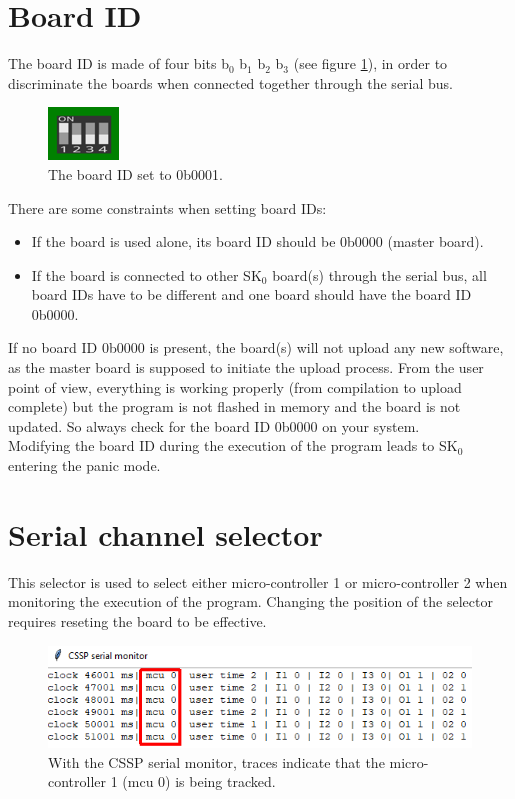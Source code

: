 \section{Board ID}
The board ID is made of four bits b$_0$ b$_1$ b$_2$ b$_3$ (see figure \ref{annexes:SK0-boardid}), in order to discriminate the boards when connected together through the serial bus.
\begin{figure}[h]
\centering\includegraphics[scale=0.668]{Pictures/chapterAnnexes/boardid.png}
\caption{The board ID set to 0b0001.}
\label{annexes:SK0-boardid}
\end{figure}
There are some constraints when setting board IDs:
\begin{itemize}
    \item If the board is used alone, its board ID should be 0b0000 (master board).
    \item If the board is connected to other SK$_0$ board(s) through the serial bus, all board IDs have to be different and one board should have the board ID 0b0000.
\end{itemize}
If no board ID 0b0000 is present, the board(s) will not upload any new software, as the master board is supposed to initiate the upload process. From the user point of view, everything is working properly (from compilation to upload complete) but the program is not flashed in memory and the board is not updated. So always check for the board ID 0b0000 on your system. \\
Modifying the board ID during the execution of the program leads to SK$_0$ entering the panic mode.

\section{Serial channel selector}
This selector is used to select either micro-controller 1 or micro-controller 2 when monitoring the execution of the program. Changing the position of the selector requires reseting the board to be effective.
\begin{figure}[h]
\centering\includegraphics[scale=0.668]{Pictures/chapterAnnexes/traces-channel-selector.png}
\caption{With the CSSP serial monitor, traces indicate that the micro-controller 1 (mcu 0) is being tracked.}
\label{annexes:SK0-channel-selector}
\end{figure}

